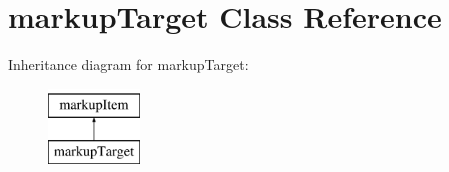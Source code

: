 \hypertarget{classmarkupTarget}{
\section{markupTarget Class Reference}
\label{classmarkupTarget}
}
Inheritance diagram for markupTarget:\begin{figure}[H]
\begin{center}
\leavevmode
\includegraphics[height=2.000000cm]{classmarkupTarget}
\end{center}
\end{figure}
